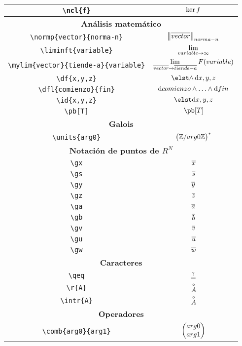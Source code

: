\begin{longtable}{|c|c|}
\verb|\ncl{f}| & $\displaystyle\ker f$ \\ \midrule 
\bottomrule \multicolumn{2}{|c|}{\textbf{Análisis matemático}} \\ \toprule 
\verb|\normp{vector}{norma-n}| & $\displaystyle\norm{\overline{vector}}_{norma-n}$ \\ \midrule 
\verb|\liminft{variable}| & $\displaystyle\lim_{{variable}\rightarrow \infty}$ \\ \midrule 
\verb|\mylim{vector}{tiende-a}{variable}| & $\displaystyle\lim_{\overline{vector} \rightarrow \overline{tiende-a}} F({variable})$ \\ \midrule 
\verb|\df{x,y,z}| & $\displaystyle\df{x,y,z}$ \\ \midrule 
\verb|\dfl{comienzo}{fin}| & $\displaystyle\operatorname{d\!}{} comienzo \wedge \dotsc \wedge \operatorname{d\!}{} fin$ \\ \midrule 
\verb|\id{x,y,z}| & $\displaystyle\id{x,y,z}$ \\ \midrule 
\verb|\pb[T]| & $\displaystyle\pb[T]$ \\ \midrule 
\bottomrule \multicolumn{2}{|c|}{\textbf{Galois}} \\ \toprule 
\verb|\units{arg0}| & $\displaystyle\left(\mathbb{Z}/{arg0}\mathbb{Z}\right)^*$ \\ \midrule 
\bottomrule \multicolumn{2}{|c|}{\textbf{Notación de puntos de $R^N$}} \\ \toprule 
\verb|\gx| & $\displaystyle\overline{x}$ \\ \midrule 
\verb|\gs| & $\displaystyle\overline{s}$ \\ \midrule 
\verb|\gy| & $\displaystyle\overline{y}$ \\ \midrule 
\verb|\gz| & $\displaystyle\overline{z}$ \\ \midrule 
\verb|\ga| & $\displaystyle\overline{a}$ \\ \midrule 
\verb|\gb| & $\displaystyle\overline{b}$ \\ \midrule 
\verb|\gv| & $\displaystyle\overline{v}$ \\ \midrule 
\verb|\gu| & $\displaystyle\overline{u}$ \\ \midrule 
\verb|\gw| & $\displaystyle\overline{w}$ \\ \midrule 
\bottomrule \multicolumn{2}{|c|}{\textbf{Caracteres}} \\ \toprule 
\verb|\qeq| & $\displaystyle\overset{?}{=}$ \\ \midrule 
\verb|\r{A}| & $\displaystyle\overset{\circ}{A}$ \\ \midrule 
\verb|\intr{A}| & $\displaystyle\overset{\circ}{A}$ \\ \midrule 
\bottomrule \multicolumn{2}{|c|}{\textbf{Operadores}} \\ \toprule 
\verb|\comb{arg0}{arg1}| & $\displaystyle\left( \begin{matrix} arg0 \\ arg1 \end{matrix} \right)$ \\ \midrule 

\end{longtable}
